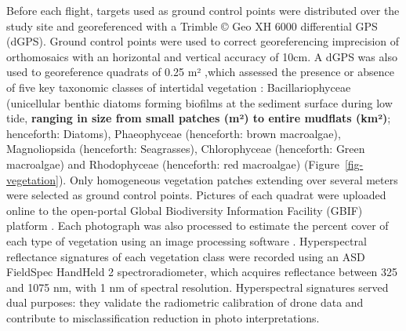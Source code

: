 \documentclass[
  number]{elsarticle}
\begin{document}
Before each flight, targets used as ground control points were
distributed over the study site and georeferenced with a Trimble © Geo
XH 6000 differential GPS (dGPS). Ground control points were used to
correct georeferencing imprecision of orthomosaics with an horizontal
and vertical accuracy of 10cm. A dGPS was also used to georeference
quadrats of 0.25 m² ,which assessed the presence or absence of five key
taxonomic classes of intertidal vegetation : Bacillariophyceae
(unicellular benthic diatoms forming biofilms at the sediment surface
during low tide, \textbf{ranging in size from small patches (m²) to
entire mudflats (km²)}; henceforth: Diatoms), Phaeophyceae (henceforth:
brown macroalgae), Magnoliopsida (henceforth: Seagrasses), Chlorophyceae
(henceforth: Green macroalgae) and Rhodophyceae (henceforth: red
macroalgae) (Figure~\ref{fig-vegetation}). Only homogeneous vegetation
patches extending over several meters were selected as ground control
points. Pictures of each quadrat were uploaded online to the open-portal
Global Biodiversity Information Facility (GBIF) platform
\citep{BedeGbif}. Each photograph was also processed to estimate the
percent cover of each type of vegetation using an image processing
software \citep[ImageJ,][]{schneider2012nih}. Hyperspectral reflectance
signatures of each vegetation class were recorded using an ASD FieldSpec
HandHeld 2 spectroradiometer, which acquires reflectance between 325 and
1075 nm, with 1 nm of spectral resolution. Hyperspectral signatures
served dual purposes: they validate the radiometric calibration of drone
data and contribute to misclassification reduction in photo
interpretations.
\end{document}
